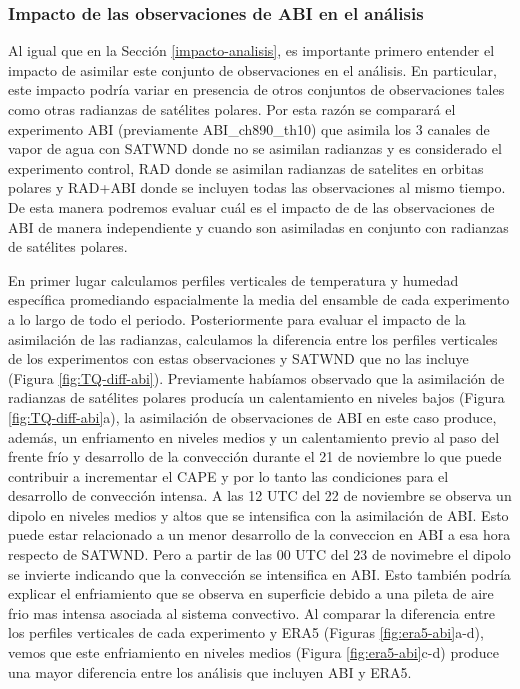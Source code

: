 \documentclass[12pt,oneside,a4paper]{reedthesis}
\begin{document}
\hypertarget{impacto-de-las-observaciones-de-abi-en-el-anuxe1lisis}{%
\subsubsection{Impacto de las observaciones de ABI en el análisis}\label{impacto-de-las-observaciones-de-abi-en-el-anuxe1lisis}}

Al igual que en la Sección \ref{impacto-analisis}, es importante primero entender el impacto de asimilar este conjunto de observaciones en el análisis. En particular, este impacto podría variar en presencia de otros conjuntos de observaciones tales como otras radianzas de satélites polares. Por esta razón se comparará el experimento ABI (previamente ABI\_ch890\_th10) que asimila los 3 canales de vapor de agua con SATWND donde no se asimilan radianzas y es considerado el experimento control, RAD donde se asimilan radianzas de satelites en orbitas polares y RAD+ABI donde se incluyen todas las observaciones al mismo tiempo. De esta manera podremos evaluar cuál es el impacto de de las observaciones de ABI de manera independiente y cuando son asimiladas en conjunto con radianzas de satélites polares.

En primer lugar calculamos perfiles verticales de temperatura y humedad específica promediando espacialmente la media del ensamble de cada experimento a lo largo de todo el periodo. Posteriormente para evaluar el impacto de la asimilación de las radianzas, calculamos la diferencia entre los perfiles verticales de los experimentos con estas observaciones y SATWND que no las incluye (Figura \ref{fig:TQ-diff-abi}). Previamente habíamos observado que la asimilación de radianzas de satélites polares producía un calentamiento en niveles bajos (Figura \ref{fig:TQ-diff-abi}a), la asimilación de observaciones de ABI en este caso produce, además, un enfriamento en niveles medios y un calentamiento previo al paso del frente frío y desarrollo de la convección durante el 21 de noviembre lo que puede contribuir a incrementar el CAPE y por lo tanto las condiciones para el desarrollo de convección intensa. A las 12 UTC del 22 de noviembre se observa un dipolo en niveles medios y altos que se intensifica con la asimilación de ABI. Esto puede estar relacionado a un menor desarrollo de la conveccion en ABI a esa hora respecto de SATWND. Pero a partir de las 00 UTC del 23 de novimebre el dipolo se invierte indicando que la convección se intensifica en ABI. Esto también podría explicar el enfriamiento que se observa en superficie debido a una pileta de aire frio mas intensa asociada al sistema convectivo.
Al comparar la diferencia entre los perfiles verticales de cada experimento y ERA5 (Figuras \ref{fig:era5-abi}a-d), vemos que este enfriamiento en niveles medios (Figura \ref{fig:era5-abi}c-d) produce una mayor diferencia entre los análisis que incluyen ABI y ERA5.
\end{document}
